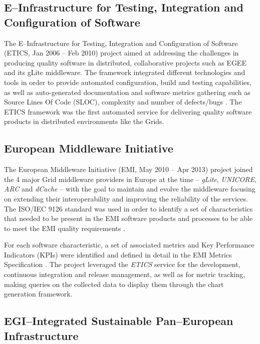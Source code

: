 \documentclass[journal]{IEEEtran}
\begin{document}
\subsection{E--Infrastructure for Testing, Integration and Configuration of Software}

The E--Infrastructure for Testing, Integration and Configuration of Software
\cite{cordis:etics, cordis:etics2} (ETICS, Jan 2006 -- Feb 2010) project aimed
at addressing the challenges in producing quality software in distributed,
collaborative projects such as EGEE and its gLite middleware. The framework
integrated different technologies and tools in order to provide automated configuration,
build and testing capabilities, as well as auto-generated documentation and
software metrics gathering such as Source Lines Of Code (SLOC), complexity and
number of defects/bugs \cite{etics}. The ETICS framework was the first automated
service for delivering quality software products in distributed environments like
the Grids.

\subsection{European Middleware Initiative}

The European Middleware Initiative (EMI, May 2010 -- Apr 2013)
\cite{cordis:emi} project joined the 4 major Grid middleware providers in
Europe at the time -- {\sl gLite}, {\sl UNICORE}, {\sl ARC} and {\sl dCache} --
with the goal to maintain and evolve the middleware focusing on extending their
interoperability and improving the reliability of the services. The
ISO/IEC 9126 \cite{iso-9126} standard was used in order to identify a set of
characteristics that needed to be present in the EMI software products and
processes to be able to meet the EMI quality requirements
\cite{emi-quality-model}.

For each software characteristic, a set of associated
metrics and Key Performance Indicators (KPIs) were identified and defined in
detail in the EMI Metrics Specification \cite{emi-metrics}. The project
leveraged the {\sl ETICS} service for the development, continuous integration and release management,
as well as for metric tracking, making queries on the collected data to display
them through the chart generation framework.

\subsection{EGI--Integrated Sustainable Pan--European Infrastructure}
\end{document}
